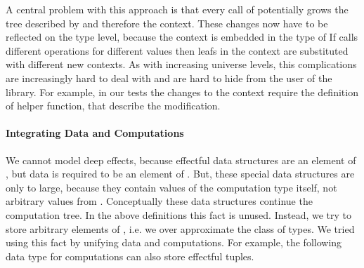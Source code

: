 % 

A central problem with this approach is that every call of \AgdaFunction{>>=}
potentially grows the tree described by  and therefore the
context.
These changes now have to be reflected on the type level, because the context is
embedded in the type of 
If \AgdaFunction{>>=} calls different operations for different values then leafs
in the context are substituted with different new contexts.
As with increasing universe levels, this complications are increasingly hard to
deal with and are hard to hide from the user of the library.
For example, in our tests the changes to the context require the definition of
helper function, that describe the modification.

\paragraph{Integrating Data and Computations}
We cannot model deep effects, because effectful data structures are an element
of , but data is required to be an element of
.
But, these special data structures are only to large, because they contain
values of the computation type  itself, not arbitrary values
from .
Conceptually these data structures continue the computation tree.
In the above definitions this fact is unused.
Instead, we try to store arbitrary elements of , i.e. we over
approximate the class of types.
We tried using this fact by unifying data and computations.
For example, the following data type for computations can also store effectful
tuples.

